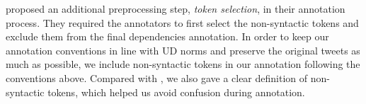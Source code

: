 \documentclass[11pt,a4paper]{article}
\newcommand{\nascomment}[1]{\textcolor{blue}{[#1 ---\textsc{nas}]}}
\newcommand{\yicomment}[1]{\textcolor{gray}{[#1 ---\textsc{Yi}]}}
\begin{document}
 proposed an additional
preprocessing step, \emph{token selection}, in their annotation process.
They required the annotators to first select the non-syntactic
tokens and exclude them from the final dependencies annotation.
In order to keep our annotation conventions in line with UD norms and preserve the original tweets as much as possible,
we include non-syntactic tokens in our annotation following the
conventions above. Compared with \citet{kong-EtAl:2014:EMNLP2014},
we also gave a clear %
definition of non-syntactic tokens, which helped
us avoid confusion during annotation.

\end{document}
